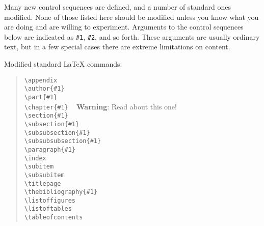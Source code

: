 \noindent
Many new control sequences are defined, and a number of standard ones
modified. None of those listed here should be modified unless you know
what you are doing and are willing to experiment. Arguments to the
control sequences below are indicated as \verb|#1|, \verb|#2|, and so
forth. These arguments are usually ordinary text, but in a few special
cases there are extreme limitations on content.

\noindent Modified standard \LaTeX{} commands:

\begin{quote}
\verb|\appendix| \\
\verb|\author{#1}| \\
\verb|\part{#1}| \\
\verb|\chapter{#1}| ~ {\bf Warning}: Read about this one!\\
\verb|\section{#1}| \\
\verb|\subsection{#1}| \\
\verb|\subsubsection{#1}| \\
\verb|\subsubsubsection{#1}| \\
\verb|\paragraph{#1}| \\
\verb|\index| \\
\verb|\subitem| \\
\verb|\subsubitem| \\
\verb|\titlepage| \\
\verb|\thebibliography{#1}| \\
\verb|\listoffigures| \\
\verb|\listoftables| \\
\verb|\tableofcontents|
\end{quote}

